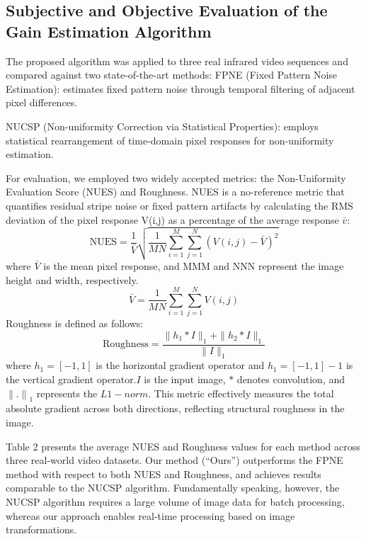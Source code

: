 \documentclass[a4paper,fleqn]{cas-dc}
\begin{document}
\subsection{Subjective and Objective Evaluation of the Gain Estimation Algorithm}
\label{subsec2}

The proposed algorithm was applied to three real infrared video sequences and compared against two state-of-the-art methods:
FPNE (Fixed Pattern Noise Estimation): estimates fixed pattern noise through temporal filtering of adjacent pixel differences\citep{liu_fpn_2019}.

NUCSP (Non-uniformity Correction via Statistical Properties): employs statistical rearrangement of time-domain pixel responses for non-uniformity estimation\citep{dandan_nonuniformity_2024}.

For evaluation, we employed two widely accepted metrics: the Non-Uniformity Evaluation Score (NUES) and Roughness\citep{svensson_evaluation_2013,sui_novel_2013}. NUES is a no-reference metric that quantifies residual stripe noise or fixed pattern artifacts by calculating the RMS deviation of the pixel response V(i,j) as a percentage of the average response $\bar{v}$:
\begin{equation}
\text{NUES} = \frac{1}{\bar{V}} \sqrt{ \frac{1}{MN} \sum_{i=1}^{M} \sum_{j=1}^{N} \left( V(i,j) - \bar{V} \right)^2 }
\end{equation}
where $\bar{V}$ is the mean pixel response, and MMM and NNN represent the image height and width, respectively.
\begin{equation}
\bar{V} = \frac{1}{MN} \sum_{i=1}^{M} \sum_{j=1}^{N} V(i,j)
\end{equation}
Roughness is defined as follows:
\begin{equation}
\text{Roughness} = \frac{ \| h_1 * I \|_1 + \| h_2 * I \|_1 }{ \| I \|_1 }
\end{equation}
where $h_1=[-1,1]$ is the horizontal gradient operator and $h_1=[-1,1]-1$ is the vertical gradient operator.$I$ is the input image, $*$ denotes convolution, and ${\parallel.\parallel}_1$ represents the $L1-norm$. This metric effectively measures the total absolute gradient across both directions, reflecting structural roughness in the image.

Table 2 presents the average NUES and Roughness values for each method across three real-world video datasets. Our method (“Ours”) outperforms the FPNE method with respect to both NUES and Roughness, and achieves results comparable to the NUCSP algorithm. Fundamentally speaking, however, the NUCSP algorithm requires a large volume of image data for batch processing, whereas our approach enables real-time processing based on image transformations.
\end{document}
